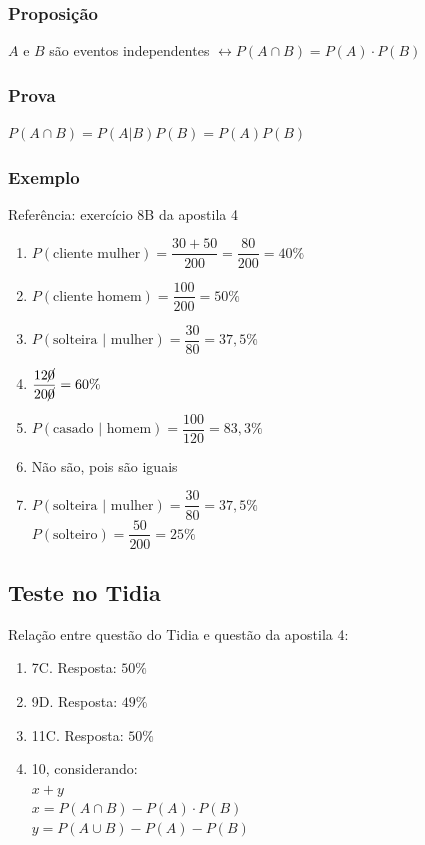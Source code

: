 \documentclass[a4paper]{article}
\begin{document}
	\subsubsection{Proposição}
	
	$A$ e $B$ são eventos independentes \hspace{5mm} $\leftrightarrow P(A \cap B) = P(A) \cdot P(B)$
	
	\subsubsection{Prova}
	
	$P(A \cap B) = P(A|B)P(B) = P(A)P(B)$
	
	\subsubsection{Exemplo}
	
	Referência: exercício 8B da apostila 4
	
	\begin{enumerate}[label=\alph*.]
		\item $P(\text{cliente mulher}) = \dfrac{30 + 50}{200} = \dfrac{80}{200} = 40\%$
		\item $P(\text{cliente homem}) = \dfrac{100}{200} = 50\%$
		\item $P(\text{solteira }|\text{ mulher}) = \dfrac{30}{80} = 37,5\%$
		\item $\dfrac{12\cancel{0}}{20\cancel{0}} = 60\%$
		\item $P(\text{casado }|\text{ homem}) = \dfrac{100}{120} = 83,3\%$
		\item Não são, pois são iguais
		\item $P(\text{solteira }|\text{ mulher}) = \dfrac{30}{80} = 37,5\%$ \\
			$P(\text{solteiro}) = \dfrac{50}{200} = 25\%$\\
	\end{enumerate}

	\subsection{Teste no Tidia}
	
	Relação entre questão do Tidia e questão da apostila 4:
	
	\begin{enumerate}
		\item 7C. Resposta: $50\%$
		\item 9D. Resposta: $49\%$
		\item 11C. Resposta: $50\%$
		\item 10, considerando: \\
			$x+y$ \\
			$x = P(A \cap B) - P(A) \cdot P(B)$ \\
			$y = P(A \cup B) - P(A) - P(B)$
	\end{enumerate}
	
\end{document}
